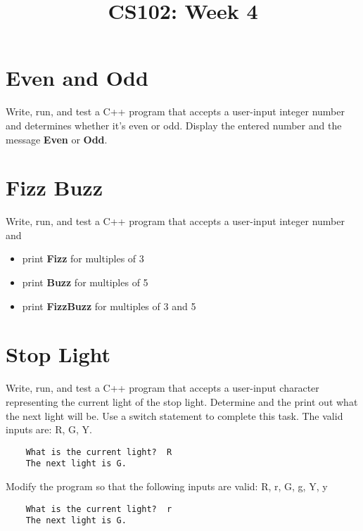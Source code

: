 \documentclass{article}
\begin{document}
\title{CS102: Week 4}

\maketitle

\section*{Even and Odd}
Write, run, and test a C++ program that accepts a user-input integer number and determines whether it’s even or odd. Display the entered number and the message \textbf{Even} or \textbf{Odd}.

\section*{Fizz Buzz}
Write, run, and test a C++ program that accepts a user-input integer number and  
\begin{itemize}
	\item print \textbf{Fizz} for multiples of 3
	\item print \textbf{Buzz} for multiples of 5
	\item print \textbf{FizzBuzz} for multiples of 3 and 5
\end{itemize}

\section*{Stop Light}

Write, run, and test a C++ program that accepts a user-input character representing the current light of the stop light. Determine and the print out what the next light will be. Use a switch statement to complete this task. The valid inputs are: R, G, Y.
\begin{verbatim}
	What is the current light?  R
	The next light is G.
\end{verbatim}

Modify the program so that the following inputs are valid: R, r, G, g, Y, y
\begin{verbatim}
	What is the current light?  r
	The next light is G.
\end{verbatim}
\end{document}
